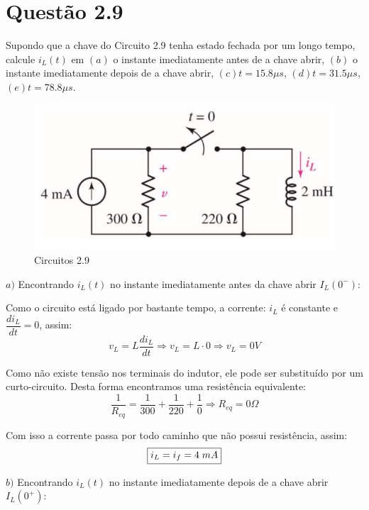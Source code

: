 \documentclass[
	12pt,				%
	oneside,			%
	a4paper,			%
	english,			%
	french,				%
	spanish,			%
	brazil				%
	]{abntex2}
\begin{document}
\section*{Questão 2.9}
Supondo que a chave do Circuito 2.9 tenha estado fechada por um longo tempo, calcule $i_L(t)$ em $(a)$ o instante imediatamente antes de a chave abrir, $(b)$ o instante imediatamente depois de a chave abrir, $(c) t=15.8\mu s$, $(d) t=31.5\mu s$, $(e) t=78.8\mu s$.

\begin{figure}[htb]
	\centering
	\includegraphics[scale=0.5]{2-9.PNG}
	\caption{Circuitos 2.9}
\end{figure}

$a)$ Encontrando $i_L(t)$ no instante imediatamente antes da chave abrir $I_L(0^-):$

Como o circuito está ligado por bastante tempo, a corrente: $i_L$ é constante e $\dfrac{d i_L}{dt} = 0$, assim:
$$v_L = L\dfrac{d i_L}{dt} \Longrightarrow v_L = L \cdot 0 \Longrightarrow v_L = 0V$$

Como não existe tensão nos terminais do indutor, ele pode ser substituído por um curto-circuito. Desta forma encontramos uma resistência equivalente:
$$\dfrac{1}{R_{eq}}  = \dfrac{1}{300} + \dfrac{1}{220} + \dfrac{1}{0} \Longrightarrow  R_{eq} = 0\Omega$$

Com isso a corrente passa por todo caminho que não possui resistência, assim:
\begin{equation}
    \centering
    \fbox{$i_L = i_f = 4\;mA$}    
\end{equation}

$b)$ Encontrando $i_L(t)$ no instante imediatamente depois de a chave abrir $I_L(0^+):$
\end{document}
